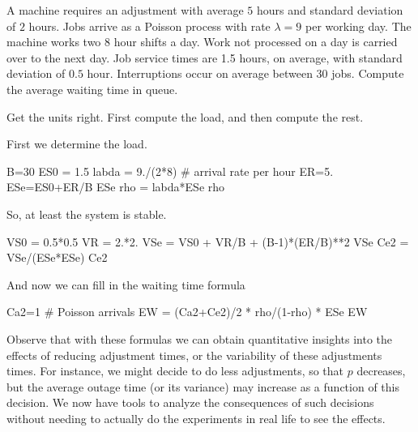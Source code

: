 \begin{exercise}[\faPhoto]
  A machine requires an adjustment with average $5$ hours and standard deviation of $2$ hours.
  Jobs arrive as a Poisson process with rate $\lambda=9$ per working day.
  The machine works two $8$ hour shifts a day.
  Work not processed on a day is carried over to the next day.
  Job service times are 1.5 hours, on average, with standard deviation of $0.5$ hour.
  Interruptions occur on average between $30$ jobs.
  Compute the average waiting time in queue.
\begin{hint}
  Get the units right. First compute the load, and then compute the rest.
\end{hint}
\begin{solution}
  First we determine the load. 
  \begin{pyconsole}
B=30
ES0 = 1.5
labda = 9./(2*8) # arrival rate per hour
ER=5.
ESe=ES0+ER/B
ESe
rho = labda*ESe
rho
  \end{pyconsole}
So, at least the system is stable.

\begin{pyconsole}
VS0 = 0.5*0.5
VR = 2.*2.
VSe = VS0 + VR/B + (B-1)*(ER/B)**2
VSe
Ce2 = VSe/(ESe*ESe)
Ce2
\end{pyconsole}

And now we can fill in the waiting time formula
\begin{pyconsole}
Ca2=1 # Poisson arrivals
EW = (Ca2+Ce2)/2 * rho/(1-rho) * ESe
EW  
\end{pyconsole}
\end{solution}
\end{exercise}

Observe that with these formulas we can obtain quantitative insights into the effects of reducing adjustment times, or the variability of these adjustments times.
For instance, we might decide to do less adjustments, so that $p$ decreases, but the average outage time (or its variance) may increase as a function of this decision.
We now have tools to analyze the consequences of such decisions without needing to actually do the experiments in real life to see the effects.






